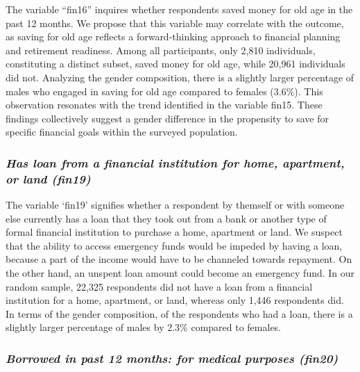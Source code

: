 \documentclass[12pt]{article}
\begin{document}
The variable ``fin16'' inquires whether respondents saved money for old
age in the past 12 months. We propose that this variable may correlate
with the outcome, as saving for old age reflects a forward-thinking
approach to financial planning and retirement readiness. Among all
participants, only 2,810 individuals, constituting a distinct subset,
saved money for old age, while 20,961 individuals did not. Analyzing the
gender composition, there is a slightly larger percentage of males who
engaged in saving for old age compared to females (3.6\%). This
observation resonates with the trend identified in the variable fin15.
These findings collectively suggest a gender difference in the
propensity to save for specific financial goals within the surveyed
population.

\hypertarget{has-loan-from-a-financial-institution-for-home-apartment-or-land-fin19}{%
\subsubsection{\texorpdfstring{\emph{Has loan from a financial
institution for home, apartment, or land
(fin19)}}{Has loan from a financial institution for home, apartment, or land (fin19)}}\label{has-loan-from-a-financial-institution-for-home-apartment-or-land-fin19}}

The variable `fin19' signifies whether a respondent by themself or with
someone else currently has a loan that they took out from a bank or
another type of formal financial institution to purchase a home,
apartment or land. We suspect that the ability to access emergency funds
would be impeded by having a loan, because a part of the income would
have to be channeled towards repayment. On the other hand, an unspent
loan amount could become an emergency fund. In our random sample, 22,325
respondents did not have a loan from a financial institution for a home,
apartment, or land, whereas only 1,446 respondents did. In terms of the
gender composition, of the respondents who had a loan, there is a
slightly larger percentage of males by 2.3\% compared to females.

\hypertarget{borrowed-in-past-12-months-for-medical-purposes-fin20}{%
\subsubsection{\texorpdfstring{\emph{Borrowed in past 12 months: for
medical purposes
(fin20)}}{Borrowed in past 12 months: for medical purposes (fin20)}}\label{borrowed-in-past-12-months-for-medical-purposes-fin20}}
\end{document}

